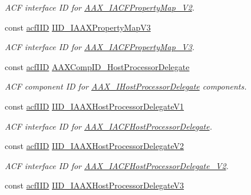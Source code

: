 \begin{Indent}
\begin{DoxyCompactItemize}
\begin{DoxyCompactList}\small\item\em A\+CF interface ID for \mbox{\hyperlink{a01749}{A\+A\+X\+\_\+\+I\+A\+C\+F\+Property\+Map\+\_\+\+V2}}. \end{DoxyCompactList}\item 
const \mbox{\hyperlink{a00269_a59df0b41744eee7a066787aaedf97f67}{acf\+I\+ID}} \mbox{\hyperlink{a00683_a26d424454425e6feb3a0c120466fe971}{I\+I\+D\+\_\+\+I\+A\+A\+X\+Property\+Map\+V3}}
\begin{DoxyCompactList}\small\item\em A\+CF interface ID for \mbox{\hyperlink{a01753}{A\+A\+X\+\_\+\+I\+A\+C\+F\+Property\+Map\+\_\+\+V3}}. \end{DoxyCompactList}\item 
const \mbox{\hyperlink{a00269_a59df0b41744eee7a066787aaedf97f67}{acf\+I\+ID}} \mbox{\hyperlink{a00683_a40a355114433e32688af311798bbede0}{A\+A\+X\+Comp\+I\+D\+\_\+\+Host\+Processor\+Delegate}}
\begin{DoxyCompactList}\small\item\em A\+CF component ID for \mbox{\hyperlink{a01837}{A\+A\+X\+\_\+\+I\+Host\+Processor\+Delegate}} components. \end{DoxyCompactList}\item 
const \mbox{\hyperlink{a00269_a59df0b41744eee7a066787aaedf97f67}{acf\+I\+ID}} \mbox{\hyperlink{a00683_a835d34cca68638475f257a61cd4e8da3}{I\+I\+D\+\_\+\+I\+A\+A\+X\+Host\+Processor\+Delegate\+V1}}
\begin{DoxyCompactList}\small\item\em A\+CF interface ID for \mbox{\hyperlink{a01701}{A\+A\+X\+\_\+\+I\+A\+C\+F\+Host\+Processor\+Delegate}}. \end{DoxyCompactList}\item 
const \mbox{\hyperlink{a00269_a59df0b41744eee7a066787aaedf97f67}{acf\+I\+ID}} \mbox{\hyperlink{a00683_abd901e3dd8fe09daf43b8891084448f3}{I\+I\+D\+\_\+\+I\+A\+A\+X\+Host\+Processor\+Delegate\+V2}}
\begin{DoxyCompactList}\small\item\em A\+CF interface ID for \mbox{\hyperlink{a01705}{A\+A\+X\+\_\+\+I\+A\+C\+F\+Host\+Processor\+Delegate\+\_\+\+V2}}. \end{DoxyCompactList}\item 
const \mbox{\hyperlink{a00269_a59df0b41744eee7a066787aaedf97f67}{acf\+I\+ID}} \mbox{\hyperlink{a00683_a41c70d23eb7fdcc1fa69e5ffab1eb38a}{I\+I\+D\+\_\+\+I\+A\+A\+X\+Host\+Processor\+Delegate\+V3}}

\end{DoxyCompactItemize}
\end{Indent}

